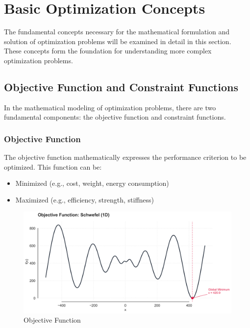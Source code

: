 \section{Basic Optimization Concepts}
The fundamental concepts necessary for the mathematical formulation and solution of optimization problems will be examined in detail in this section. These concepts form the foundation for understanding more complex optimization problems.

\subsection{Objective Function and Constraint Functions}

In the mathematical modeling of optimization problems, there are two fundamental components: the objective function and constraint functions.

\subsubsection{Objective Function}
The objective function mathematically expresses the performance criterion to be optimized. This function can be:
\begin{itemize}
    \item Minimized (e.g., cost, weight, energy consumption)
    \item Maximized (e.g., efficiency, strength, stiffness)
\end{itemize}

\begin{figure}[H]
    \centering
    \includegraphics[width=1\textwidth]{weeks_new/imgs/objective_function.png}
    \caption{Objective Function}
    \label{fig:multi_mod}
\end{figure}


